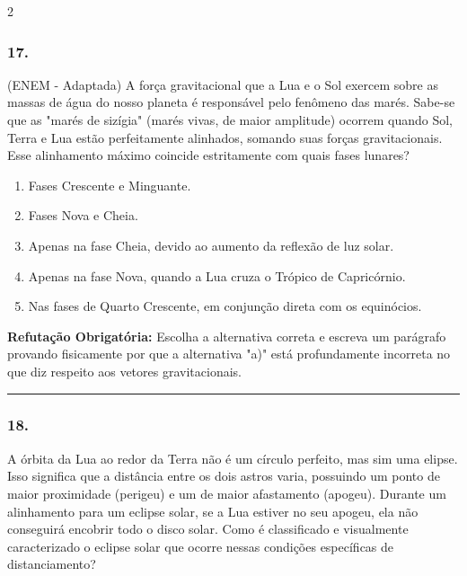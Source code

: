 \documentclass[twoside, 10pt, a4paper]{article}
\newlength{\espacoPreQuestao}\setlength{\espacoPreQuestao}{0.1cm}
\newlength{\espacoQuestao}\setlength{\espacoQuestao}{0.2cm}
\newlength{\espacoAlt}\setlength{\espacoAlt}{0.2cm}
\begin{document}
\begin{multicols*}{2}
\subsubsection*{17.} (ENEM - Adaptada) A força gravitacional que a Lua e o Sol exercem sobre as massas de água do nosso planeta é responsável pelo fenômeno das marés. Sabe-se que as "marés de sizígia" (marés vivas, de maior amplitude) ocorrem quando Sol, Terra e Lua estão perfeitamente alinhados, somando suas forças gravitacionais. Esse alinhamento máximo coincide estritamente com quais fases lunares?
\begin{enumerate}[label=\alph*), itemsep=\espacoAlt]
    \item Fases Crescente e Minguante.
    \item Fases Nova e Cheia.
    \item Apenas na fase Cheia, devido ao aumento da reflexão de luz solar.
    \item Apenas na fase Nova, quando a Lua cruza o Trópico de Capricórnio.
    \item Nas fases de Quarto Crescente, em conjunção direta com os equinócios.
\end{enumerate}
\begin{boxdica}
\textbf{Refutação Obrigatória:} Escolha a alternativa correta e escreva um parágrafo provando fisicamente por que a alternativa "a)" está profundamente incorreta no que diz respeito aos vetores gravitacionais.
\end{boxdica}
\par\vspace{\espacoQuestao}

\noindent\textcolor{CorLinha}{\rule{\linewidth}{0.5pt}} 
\par\vspace{\espacoPreQuestao}
\subsubsection*{18.} A órbita da Lua ao redor da Terra não é um círculo perfeito, mas sim uma elipse. Isso significa que a distância entre os dois astros varia, possuindo um ponto de maior proximidade (perigeu) e um de maior afastamento (apogeu). Durante um alinhamento para um eclipse solar, se a Lua estiver no seu apogeu, ela não conseguirá encobrir todo o disco solar. Como é classificado e visualmente caracterizado o eclipse solar que ocorre nessas condições específicas de distanciamento?
\par\vspace{\espacoQuestao}


\end{multicols*}
\end{document}
